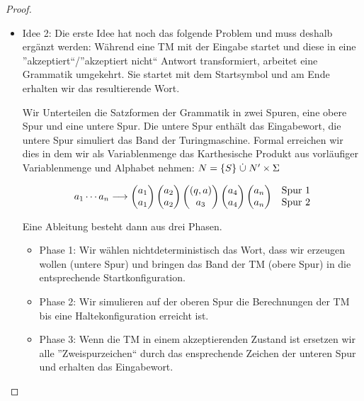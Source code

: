 \begin{proof}
\begin{itemize}
\begin{itemize}
	
	\item Idee 2:
	Die erste Idee hat noch das folgende Problem und muss deshalb ergänzt werden:
	Während eine \ac{TM} mit der Eingabe startet und diese in eine ''akzeptiert``/''akzeptiert nicht`` Antwort transformiert,
	arbeitet eine Grammatik umgekehrt. 
	Sie startet mit dem Startsymbol und am Ende erhalten wir das resultierende Wort.
	
	Wir Unterteilen die Satzformen der Grammatik in zwei Spuren, eine obere Spur und eine untere Spur.
	Die untere Spur enthält das Eingabewort, die untere Spur simuliert das Band der Turingmaschine.
	Formal erreichen wir dies in dem wir als Variablenmenge das Karthesische Produkt aus vorläufiger Variablenmenge und Alphabet nehmen:
	$N = \{S\}\mathrel{\dot\cup} N' \times\Sigma$
	
		\begin{align*}
		a_1\cdots a_n &\-->
			\pmqty{a_1\\a_1} \pmqty{a_2\\a_2} \pmqty{(q,a)\\a_3} \pmqty{a_4\\a_4} \pmqty{a_n\\a_n}
			&&\begin{matrix}\text{Spur 1}\\\text{Spur 2}\end{matrix}\\
	\end{align*}
	
	Eine Ableitung besteht dann aus drei Phasen.
	\begin{itemize}
	\item Phase 1: 
	Wir wählen nichtdeterministisch das Wort, dass wir erzeugen wollen (untere Spur) und bringen das Band der \ac{TM} (obere Spur) in die entsprechende Startkonfiguration.
	\item Phase 2:
	Wir simulieren auf der oberen Spur die Berechnungen der \ac{TM} bis eine Haltekonfiguration erreicht ist.
	\item Phase 3:
	Wenn die \ac{TM} in einem akzeptierenden Zustand ist ersetzen wir alle ''Zweispurzeichen`` durch das ensprechende Zeichen der unteren Spur und erhalten das Eingabewort.
	\end{itemize}
	
	
	

\end{itemize}
\end{itemize}
\end{proof}
